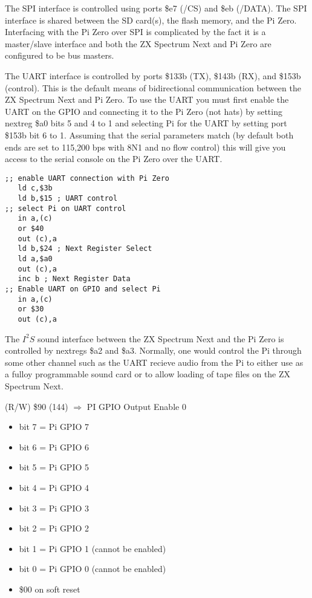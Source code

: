 The SPI interface is controlled using ports \$e7 (/CS) and \$eb
(/DATA). The SPI interface is shared between the SD card(s), the flash
memory, and the Pi Zero. Interfacing with the Pi Zero over SPI is
complicated by the fact it is a master/slave interface and both the ZX
Spectrum Next and Pi Zero are configured to be bus masters.

The UART interface is controlled by ports \$133b (TX), \$143b (RX),
and \$153b (control). This is the default means of bidirectional
communication between the ZX Spectrum Next and Pi Zero. To use the
UART you must first enable the UART on the GPIO and connecting it to
the Pi Zero (not hats) by setting nextreg \$a0 bits 5 and 4 to 1 and
selecting Pi for the UART by setting port \$153b bit 6 to 1. Assuming
that the serial parameters match (by default both ends are set to
115,200 bps with 8N1 and no flow control) this will give you access to
the serial console on the Pi Zero over the UART.

\begin{verbatim}
;; enable UART connection with Pi Zero
   ld c,$3b
   ld b,$15 ; UART control
;; select Pi on UART control
   in a,(c)
   or $40
   out (c),a
   ld b,$24 ; Next Register Select
   ld a,$a0
   out (c),a
   inc b ; Next Register Data
;; Enable UART on GPIO and select Pi
   in a,(c)
   or $30
   out (c),a
\end{verbatim}

The $I^2S$ sound interface between the ZX Spectrum Next and the Pi Zero
is controlled by nextregs \$a2 and \$a3. Normally, one would control
the Pi through some other channel such as the UART recieve audio from
the Pi to either use as a fulloy programmable sound card or to allow
loading of tape files on the ZX Spectrum Next.

(R/W) \$90 (144) $\Rightarrow$ PI GPIO Output Enable 0
\begin{itemize}
\item bit 7 = Pi GPIO 7
\item bit 6 = Pi GPIO 6
\item bit 5 = Pi GPIO 5
\item bit 4 = Pi GPIO 4
\item bit 3 = Pi GPIO 3
\item bit 2 = Pi GPIO 2
\item bit 1 = Pi GPIO 1 (cannot be enabled)
\item bit 0 = Pi GPIO 0 (cannot be enabled)
\item[] \$00 on soft reset
\end{itemize}

